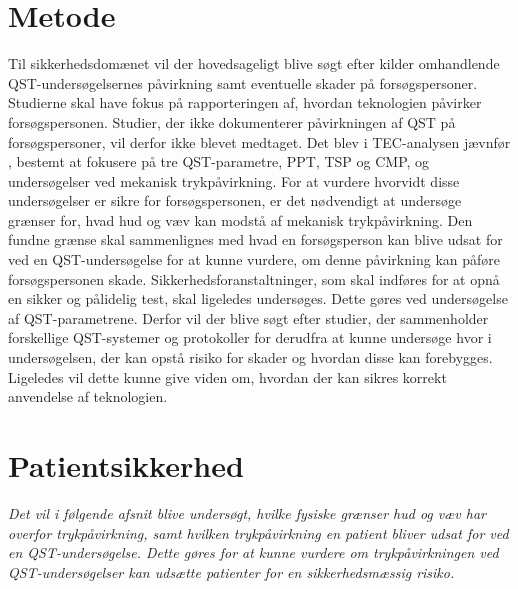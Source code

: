 \section{Metode}
Til sikkerhedsdomænet vil der hovedsageligt blive søgt efter kilder omhandlende QST-undersøgelsernes påvirkning samt eventuelle skader på forsøgspersoner. Studierne skal have fokus på rapporteringen af, hvordan teknologien påvirker forsøgspersonen. Studier, der ikke dokumenterer påvirkningen af QST på forsøgspersoner, vil derfor ikke blevet medtaget. Det blev i TEC-analysen jævnfør , bestemt at fokusere på tre QST-parametre, PPT, TSP og CMP, og undersøgelser ved mekanisk trykpåvirkning. For at vurdere hvorvidt disse undersøgelser er sikre for forsøgspersonen, er det nødvendigt at undersøge grænser for, hvad hud og væv kan modstå af mekanisk trykpåvirkning. Den fundne grænse skal sammenlignes med hvad en forsøgsperson kan blive udsat for ved en QST-undersøgelse for at kunne vurdere, om denne påvirkning kan påføre forsøgspersonen skade. Sikkerhedsforanstaltninger, som skal indføres for at opnå en sikker og pålidelig test, skal ligeledes undersøges. Dette gøres ved undersøgelse af QST-parametrene. Derfor vil der blive søgt efter studier, der sammenholder forskellige QST-systemer og protokoller for derudfra at kunne undersøge hvor i undersøgelsen, der kan opstå risiko for skader og hvordan disse kan forebygges. Ligeledes vil dette kunne give viden om, hvordan der kan sikres korrekt anvendelse af teknologien. \citep{HTAcore}


\section{Patientsikkerhed}
\textit{Det vil i følgende afsnit blive undersøgt, hvilke fysiske grænser hud og væv har overfor trykpåvirkning, samt hvilken trykpåvirkning en patient bliver udsat for ved en QST-undersøgelse. Dette gøres for at kunne vurdere om trykpåvirkningen ved QST-undersøgelser kan udsætte patienter for en sikkerhedsmæssig risiko.}


